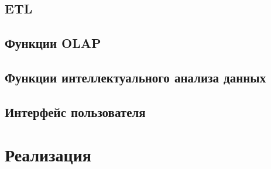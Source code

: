 \subsection{ETL}
\subsection{Функции OLAP}
\subsection{Функции интеллектуального анализа данных}
\subsection{Интерфейс пользователя}
\section{Реализация}

